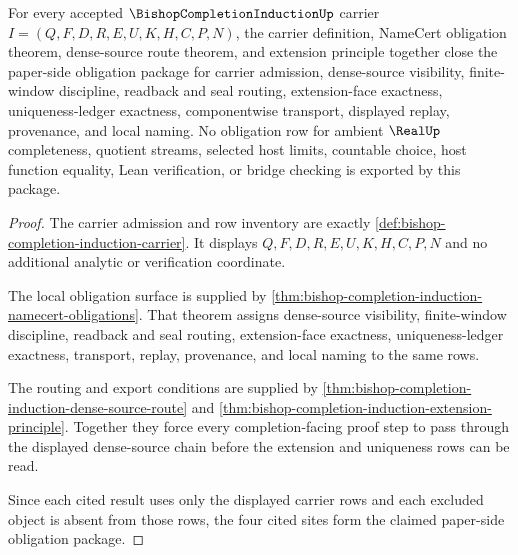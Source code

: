 \begin{theorem}
\label{thm:bishop-completion-induction-obligation-closure}
For every accepted $\BishopCompletionInductionUp$ carrier $I=(Q,F,D,R,E,U,K,H,C,P,N)$, the carrier definition, NameCert obligation theorem, dense-source route theorem, and extension principle together close the paper-side obligation package for carrier admission, dense-source visibility, finite-window discipline, readback and seal routing, extension-face exactness, uniqueness-ledger exactness, componentwise transport, displayed replay, provenance, and local naming. No obligation row for ambient $\RealUp$ completeness, quotient streams, selected host limits, countable choice, host function equality, Lean verification, or bridge checking is exported by this package.
\end{theorem}
\begin{proof}
The carrier admission and row inventory are exactly \autoref{def:bishop-completion-induction-carrier}. It displays $Q,F,D,R,E,U,K,H,C,P,N$ and no additional analytic or verification coordinate.

The local obligation surface is supplied by \autoref{thm:bishop-completion-induction-namecert-obligations}. That theorem assigns dense-source visibility, finite-window discipline, readback and seal routing, extension-face exactness, uniqueness-ledger exactness, transport, replay, provenance, and local naming to the same rows.

The routing and export conditions are supplied by \autoref{thm:bishop-completion-induction-dense-source-route} and \autoref{thm:bishop-completion-induction-extension-principle}. Together they force every completion-facing proof step to pass through the displayed dense-source chain before the extension and uniqueness rows can be read.

Since each cited result uses only the displayed carrier rows and each excluded object is absent from those rows, the four cited sites form the claimed paper-side obligation package.
\end{proof}

